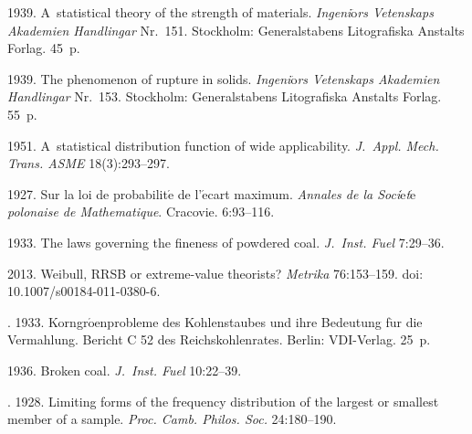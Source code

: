   \begin{multicols}{2}

\renewcommand{\bibname}{\protect\rmfamily References}



{\small\frenchspacing
{%
\begin{thebibliography}{99}

 1939.
A~statistical theory of the strength of materials.
\textit{Ingeni$\ddot{\mbox{o}}$rs Vetenskaps Akademien Handlingar} Nr.\ 151.
Stockholm: Generalstabens Litografiska Anstalts Forlag. 45~p.

 1939. The phenomenon of rupture in solids.
\textit{Ingeni$\ddot{\mbox{o}}$rs Vetenskaps Akademien Handlingar}
 Nr.\ 153. Stockholm: Generalstabens Litografiska Anstalts Forlag. 55~p.

 1951. A~statistical distribution function of wide applicability.
\textit{J.~Appl. Mech. Trans. ASME}
18(3):293--297.

 1927. Sur la loi de probabilit$\acute{\mbox{e}}$
de l'$\acute{\mbox{e}}$cart maximum.
\textit{Annales de la Soci$\acute{\mbox{e}}$t$\acute{\mbox{e}}$
polonaise de Mathematique}. Cracovie. 6:93--116.

 1933. The laws
governing the fineness of powdered coal. \textit{J.~Inst. Fuel}
7:29--36.

 2013. Weibull, RRSB or extreme-value theorists?
\textit{Metrika} 76:153--159. doi: 10.1007/s00184-011-0380-6.

. 1933.\linebreak
Korngr$\acute{\mbox{o}}${\ptb{\hspace*{-0.8mm}\ss}}enprobleme des Kohlenstaubes und
ihre Bede\-utung f$\ddot{\mbox{u}}$r die Vermahlung.
Bericht C 52 des Reichskohlenrates. Berlin: VDI-Verlag. 25~p.

 1936. Broken coal. \textit{J.~Inst. Fuel} 10:22--39.

. 1928.
Limiting forms of the frequency distribution of the largest or smallest
member of a sample. \textit{Proc. Camb. Philos. Soc.} 24:180--190.


\end{thebibliography}}}
\end{multicols}
